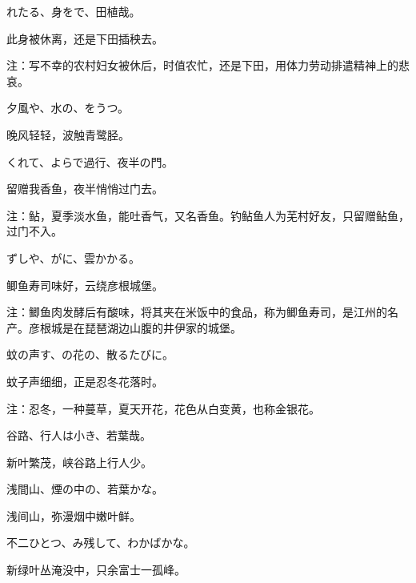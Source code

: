 \begin{haiku}
    {\FH {}れたる、身をで、田植哉。}

    {\FK 此身被休离，还是下田插秧去。}

    {\FT 注：写不幸的农村妇女被休后，时值农忙，还是下田，用体力劳动排遣精神上的悲哀。}
\end{haiku}

\begin{haiku}
    {\FH 夕風や、水の、をうつ。}

    {\FK 晚风轻轻，波触青鹭胫。}
\end{haiku}

\begin{haiku}
    {\FH {}くれて、よらで過行、夜半の門。}

    {\FK 留赠我香鱼，夜半悄悄过门去。}

    {\FT 注：鲇，夏季淡水鱼，能吐香气，又名香鱼。钓鲇鱼人为芜村好友，只留赠鲇鱼，过门不入。}
\end{haiku}

\begin{haiku}
    {\FH {}ずしや、がに、雲かかる。}

    {\FK 鲫鱼寿司味好，云绕彦根城堡。}

    {\FT 注：鲫鱼肉发酵后有酸味，将其夹在米饭中的食品，称为鲫鱼寿司，是江州的名产。彦根城是在琵琶湖边山腹的井伊家的城堡。}
\end{haiku}

\begin{haiku}
    {\FH 蚊の声す、の花の、散るたびに。}

    {\FK 蚊子声细细，正是忍冬花落时。}

    {\FT 注：忍冬，一种蔓草，夏天开花，花色从白变黄，也称金银花。}
\end{haiku}

\begin{haiku}
    {\FH 谷路、行人は小き、若葉哉。}

    {\FK 新叶繁茂，峡谷路上行人少。}
\end{haiku}

\begin{haiku}
    {\FH 浅間山、煙の中の、若葉かな。}

    {\FK 浅间山，弥漫烟中嫩叶鲜。}
\end{haiku}

\begin{haiku}
    {\FH 不二ひとつ、み残して、わかばかな。}

    {\FK 新绿叶丛淹没中，只余富士一孤峰。}
\end{haiku}

